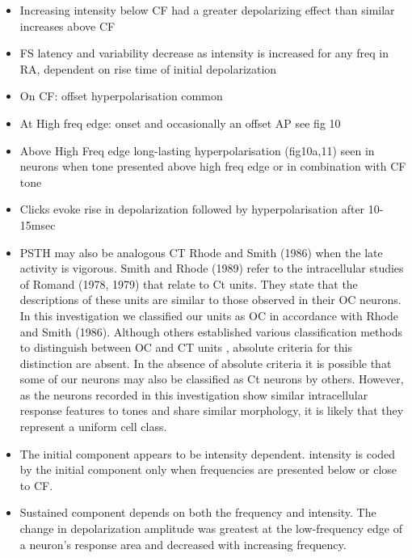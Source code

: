 \documentclass[10pt,a4paper]{article}
\begin{document}
\begin{itemize}
\item Increasing intensity below CF had a greater depolarizing effect than
  similar increases above CF
\item FS latency and variability decrease as intensity is increased for any freq
  in RA, dependent on rise time of initial depolarization
\item On CF: offset hyperpolarisation common
\item At High freq edge: onset and occasionally an offset AP see fig 10
\item Above High Freq edge long-lasting hyperpolarisation (fig10a,11) seen in
  neurons when tone presented above high freq edge or in combination with CF
  tone
\item Clicks evoke rise in depolarization followed by hyperpolarisation after
  10-15msec
\item PSTH may also be analogous CT Rhode and Smith (1986) when the late
  activity is vigorous. Smith and Rhode (1989) refer to the intracellular
  studies of Romand (1978, 1979) that relate to Ct units. They state that the
  descriptions of these units are similar to those observed in their OC
  neurons. In this investigation we classified our units as OC in accordance
  with Rhode and Smith (1986). Although others established various
  classification methods to distinguish between OC and CT units
  \citep{BlackburnSachs:1989,WinterPalmer:1995}, absolute criteria for this
  distinction are absent. In the absence of absolute criteria it is possible
  that some of our neurons may also be classified as Ct neurons by
  others. However, as the neurons recorded in this investigation show similar
  intracellular response features to tones and share similar morphology, it is
  likely that they represent a uniform cell class.
\end{itemize}

\begin{itemize}
\item The initial component appears to be intensity dependent.  intensity is
  coded by the initial component only when frequencies are presented below or
  close to CF.
\item Sustained component depends on both the frequency and intensity.  The
  change in depolarization amplitude was greatest at the low-frequency edge of a
  neuron{\textquoteright}s response area and decreased with increasing
  frequency.
\end{itemize}
\end{document}
